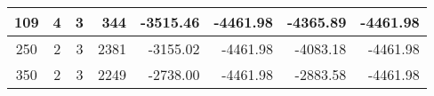 \documentclass[a4j,11pt,twocolumn]{jsarticle}
\begin{document}
\begin{landscape}
\begin{table}[]
\begin{tabular}{|c|c|c|r|r|r|r|r|}
  109   & 4       & 3       & 344                                                   & -3515.46                                                               & -4461.98                                                                 & -4365.89                                                                & -4461.98                                                                  \\ \hline
  250   & 2       & 3       & 2381                                                  & -3155.02                                                               & -4461.98                                                                 & -4083.18                                                                & -4461.98                                                                  \\ \hline
  350   & 2       & 3       & 2249                                                  & -2738.00                                                               & -4461.98                                                                 & -2883.58                                                                & -4461.98                                                                  \\ \hline
  \end{tabular}
\end{table}




\end{landscape}
\end{document}

